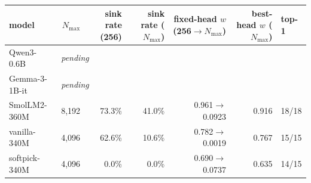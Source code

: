 \begin{tabular}{lrrrrrl}
\toprule
model & $N_{\max}$ & sink rate (256) & sink rate ($N_{\max}$) & fixed-head $w$ (256$\to N_{\max}$) & best-head $w$ ($N_{\max}$) & top-1 \\
\midrule
Qwen3-0.6B & \multicolumn{6}{l}{\emph{pending}} \\
Gemma-3-1B-it & \multicolumn{6}{l}{\emph{pending}} \\
SmolLM2-360M & 8,192 & 73.3\% & 41.0\% & 0.961$\to$0.0923 & 0.916 & 18/18 \\
vanilla-340M & 4,096 & 62.6\% & 10.6\% & 0.782$\to$0.0019 & 0.767 & 15/15 \\
softpick-340M & 4,096 & 0.0\% & 0.0\% & 0.690$\to$0.0737 & 0.635 & 14/15 \\
\bottomrule
\end{tabular}
